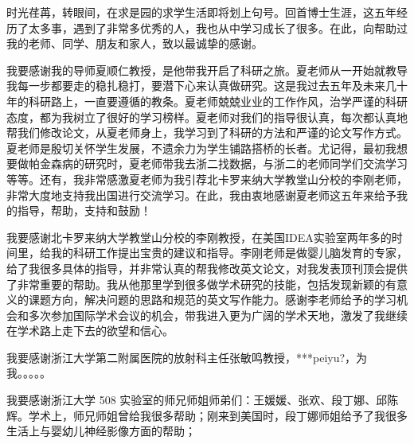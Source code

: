 \cleardoublepage
{}
时光荏苒，转眼间，在求是园的求学生活即将划上句号。回首博士生涯，这五年经历了太多事，遇到了非常多优秀的人，我也从中学习成长了很多。在此，向帮助过我的老师、同学、朋友和家人，致以最诚挚的感谢。

我要感谢我的导师夏顺仁教授，是他带我开启了科研之旅。夏老师从一开始就教导我每一步都要走的稳扎稳打，要潜下心来认真做研究。这是我过去五年及未来几十年的科研路上，一直要遵循的教条。夏老师兢兢业业的工作作风，治学严谨的科研态度，都为我树立了很好的学习榜样。夏老师对我们的指导很认真，每次都认真地帮我们修改论文，从夏老师身上，我学习到了科研的方法和严谨的论文写作方式。夏老师是殷切关怀学生发展，不遗余力为学生铺路搭桥的长者。尤记得，最初我想要做帕金森病的研究时，夏老师带我去浙二找数据，与浙二的老师同学们交流学习等等。还有，我非常感激夏老师为我引荐北卡罗来纳大学教堂山分校的李刚老师，非常大度地支持我出国进行交流学习。在此，我由衷地感谢夏老师这五年来给予我的指导，帮助，支持和鼓励！

我要感谢北卡罗来纳大学教堂山分校的李刚教授，在美国IDEA实验室两年多的时间里，给我的科研工作提出宝贵的建议和指导。李刚老师是做婴儿脑发育的专家，给了我很多具体的指导，并非常认真的帮我修改英文论文，对我发表顶刊顶会提供了非常重要的帮助。我从他那里学到很多做学术研究的技能，包括发现新颖的有意义的课题方向，解决问题的思路和规范的英文写作能力。感谢李老师给予的学习机会和多次参加国际学术会议的机会，带我进入更为广阔的学术天地，激发了我继续在学术路上走下去的欲望和信心。

我要感谢浙江大学第二附属医院的放射科主任张敏鸣教授，***peiyu?，为我。。。。。

我要感谢浙江大学 508 实验室的师兄师姐师弟们：王媛媛、张欢、段丁娜、邱陈辉。学术上，师兄师姐曾给我很多帮助；刚来到美国时，段丁娜师姐给予了我很多生活上与婴幼儿神经影像方面的帮助；